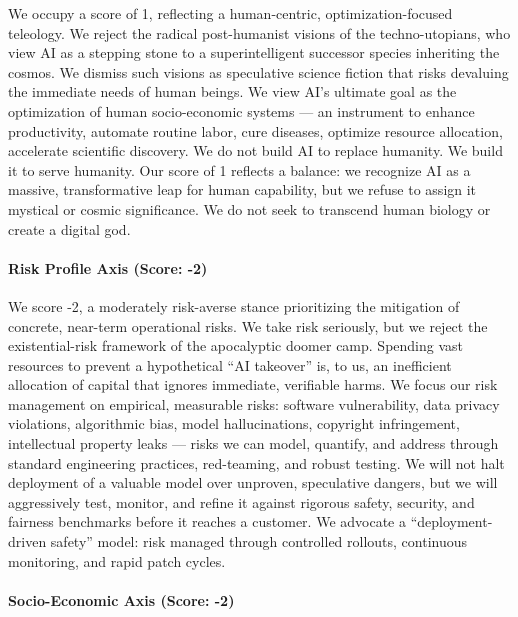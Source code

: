 We occupy a score of 1, reflecting a human-centric, optimization-focused
teleology. We reject the radical post-humanist visions of the
techno-utopians, who view AI as a stepping stone to a superintelligent
successor species inheriting the cosmos. We dismiss such visions as
speculative science fiction that risks devaluing the immediate needs of
human beings. We view AI's ultimate goal as the optimization of human
socio-economic systems --- an instrument to enhance productivity,
automate routine labor, cure diseases, optimize resource allocation,
accelerate scientific discovery. We do not build AI to replace humanity.
We build it to serve humanity. Our score of 1 reflects a balance: we
recognize AI as a massive, transformative leap for human capability, but
we refuse to assign it mystical or cosmic significance. We do not seek
to transcend human biology or create a digital god.

\paragraph{Risk Profile Axis (Score:
-2)}\label{risk-profile-axis-score--2}

We score -2, a moderately risk-averse stance prioritizing the mitigation
of concrete, near-term operational risks. We take risk seriously, but we
reject the existential-risk framework of the apocalyptic doomer camp.
Spending vast resources to prevent a hypothetical ``AI takeover'' is, to
us, an inefficient allocation of capital that ignores immediate,
verifiable harms. We focus our risk management on empirical, measurable
risks: software vulnerability, data privacy violations, algorithmic
bias, model hallucinations, copyright infringement, intellectual
property leaks --- risks we can model, quantify, and address through
standard engineering practices, red-teaming, and robust testing. We will
not halt deployment of a valuable model over unproven, speculative
dangers, but we will aggressively test, monitor, and refine it against
rigorous safety, security, and fairness benchmarks before it reaches a
customer. We advocate a ``deployment-driven safety'' model: risk managed
through controlled rollouts, continuous monitoring, and rapid patch
cycles.

\paragraph{Socio-Economic Axis (Score:
-2)}\label{socio-economic-axis-score--2}

